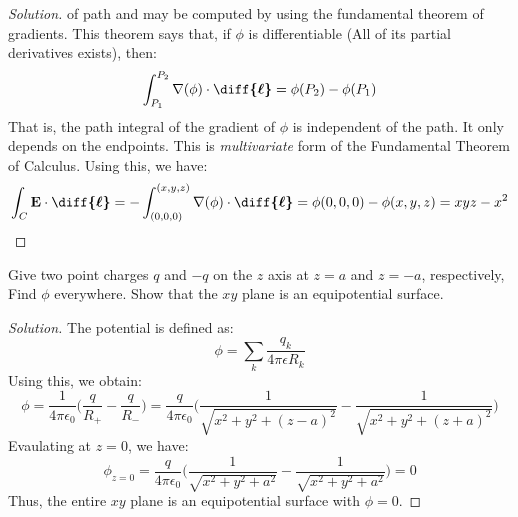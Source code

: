 \documentclass[crop=false,class=article,oneside]{standalone}
\begin{document}
\begin{proof}[Solution]
            of path and may be computed by using the fundamental
            theorem of gradients. This theorem says that,
            if $\phi$ is differentiable
            (All of its partial derivatives exists), then:
            \begin{equation*}
                \int_{P_{1}}^{P_{2}}
                \nabla(\phi)\cdot\boldsymbol{\diff{\ell}}
                =\phi(P_{2})-\phi(P_{1})
            \end{equation*}
            That is, the path integral of the gradient of
            $\phi$ is independent of the path. It only depends
            on the endpoints.
            This is \textit{multivariate} form of the
            Fundamental Theorem of Calculus. Using this, we have:
            \begin{align*}
                \int_{C}\mathbf{E}\cdot\boldsymbol{\diff{\ell}}
                =-\int _{(0,0,0)}^{(x,y,z)}
                \nabla(\phi)\cdot\boldsymbol{\diff{\ell}}
                =\phi(0,0,0)-\phi(x,y,z)
                =xyz-x^2
            \end{align*}
        \end{proof}
        \begin{problem}[Wangsness 5-3]
            \label{problem:EMAG_Wangsness_5_3}
            Give two point charges $q$ and $-q$ on the
            $z$ axis at $z=a$ and $z=-a$, respectively,
            Find $\phi$ everywhere. Show that the
            $xy$ plane is an equipotential surface.
        \end{problem}
        \begin{proof}[Solution]
            The potential is defined as:
            \begin{equation*}
                \phi=\sum_{k}\frac{q_{k}}{4\pi\epsilon{R_{k}}}
            \end{equation*}
            Using this, we obtain:
            \begin{equation*}
                \phi
                =\frac{1}{4\pi\epsilon_0}\bigg(
                    \frac{q}{R_{+}}-\frac{q}{R_{-}}
                \bigg)
                =\frac{q}{4\pi\epsilon_0}
                \bigg(
                    \frac{1}{\sqrt{x^2+y^2+(z-a)^2}}
                    -\frac{1}{\sqrt{x^2+y^2+(z+a)^2}}
                \bigg)
            \end{equation*}
            Evaulating at $z=0$, we have:
            \begin{equation*}
                \phi_{z=0}
                =\frac{q}{4\pi\epsilon_0}\bigg(
                    \frac{1}{\sqrt{x^2+y^2+a^2}}
                    -\frac{1}{\sqrt{x^2+y^2+a^2}}
                \bigg)
                =0
            \end{equation*}
            Thus, the entire $xy$ plane is an
            equipotential surface with $\phi=0$.
        \end{proof}
\end{document}
